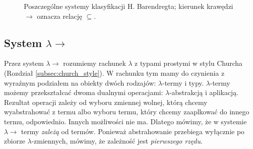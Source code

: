 \begin{figure}[!h]
  \centering
  \caption{Poszczególne systemy klasyfikacji H. Barendregta; kierunek krawędzi \(\to\)  oznacza relację \(\subseteq\).}\label{fig:lambda-cube}
\end{figure}

\subsection{System \(\lambda{\to}\)}
Przez system \(\lambda{\to}\) rozumiemy rachunek \(\lambda\)  z typami prostymi w stylu Churcha (Rozdział \ref{subsec:church_style}). W rachunku tym mamy do czynienia z wyraźnym podziałem na obiekty dwóch rodzajów: \(\lambda\)-termy i typy. \(\lambda\)-termy możemy przekształcać dwoma dualnymi operacjami: \(\lambda\)-abstrakcją i aplikacją. Rezultat operacji zależy od wyboru zmiennej wolnej, którą chcemy wyabstrahować z termu albo wyboru termu, który chcemy zaaplkować do innego termu, odpowiednio. Innych możliwości nie ma. Dlatego mówimy, że w systemie \(\lambda{\to}\) termy \emph{zależą} od termów. Ponieważ abstrahowanie przebiega wyłącznie po zbiorze \(\lambda\)-zmiennych, mówimy, że zależność jest \emph{pierwszego rzędu}.

